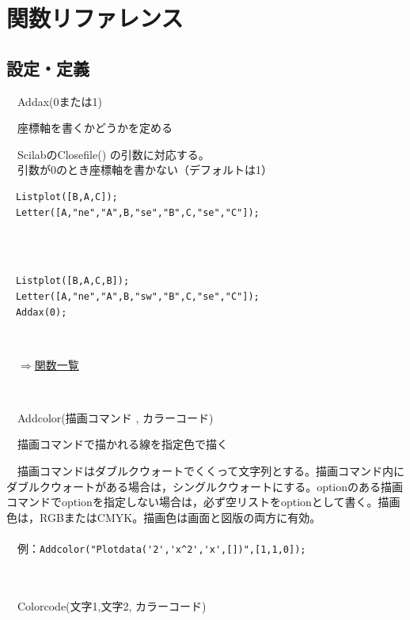 \documentclass[papersize,a4paper,12pt,uplatex]{jsarticle}
\begin{document}
\newpage

\section{関数リファレンス}
\subsection{設定・定義}

\begin{description}

\hypertarget{addax}{}
\item[関数]　Addax(0または1)
\item[機能]　座標軸を書くかどうかを定める
\item[説明]　ScilabのClosefile() の引数に対応する。\\
　引数が0のとき座標軸を書かない（デフォルトは1）
\begin{verbatim}
　Listplot([B,A,C]);
　Letter([A,"ne","A",B,"se","B",C,"se","C"]);
\end{verbatim}
　\\
　
\begin{verbatim}
　Listplot([B,A,C,B]);
　Letter([A,"ne","A",B,"sw","B",C,"se","C"]);
　Addax(0);
\end{verbatim}
　\\
\begin{flushright}　\hyperlink{functionlist}{$\Rightarrow$関数一覧}\end{flushright}
　\\
\hypertarget{addcolor}{}
\item[関数]　Addcolor(描画コマンド , カラーコード)
\item[機能]　描画コマンドで描かれる線を指定色で描く
\item[説明]　描画コマンドはダブルクウォートでくくって文字列とする。描画コマンド内にダブルクウォートがある場合は，シングルクウォートにする。optionのある描画コマンドでoptionを指定しない場合は，必ず空リストをoptionとして書く。描画色は，RGBまたはCMYK。描画色は画面と図版の両方に有効。\\
　\\
　例：\verb|Addcolor("Plotdata('2','x^2','x',[])",[1,1,0]);|\\
　\\
　\\
\hypertarget{colorcode}{}
\item[関数]　Colorcode(文字1,文字2, カラーコード)

\end{description}
\end{document}
